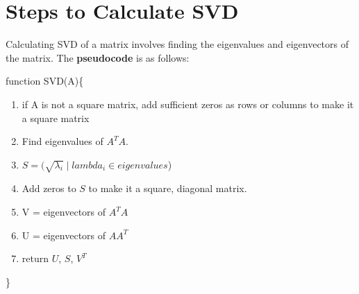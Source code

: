 \section{Steps to Calculate SVD}

	Calculating SVD of a matrix involves finding the eigenvalues and eigenvectors of the matrix. The \textbf{pseudocode} is as follows:

\vspace{5mm}

\noindent function SVD(A)\{
	\vspace{-3mm}
	\begin{enumerate}
		\item if A is not a square matrix, add sufficient zeros as rows or columns to make it a square matrix
		\item Find eigenvalues of $A^TA$.
		\item $S = (\sqrt{\lambda_i}\;|\;lambda_i \in eigenvalues$)
		\item Add zeros to $S$ to make it a square, diagonal matrix.
		\item V = eigenvectors of $A^TA$
		\item U = eigenvectors of $AA^T$
		\item return $U$, $S$, $V^T$
	\end{enumerate}

	\vspace{-3mm}
\noindent \}
